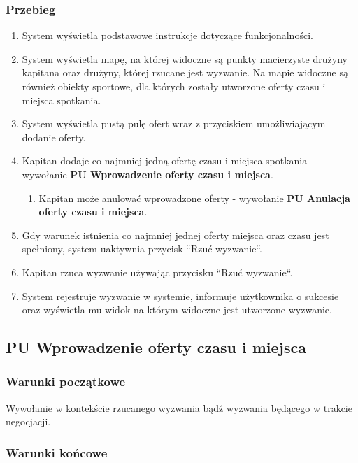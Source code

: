 \subsubsection{Przebieg}

\begin{enumerate}
  \item System wyświetla podstawowe instrukcje dotyczące funkcjonalności.
  \item System wyświetla mapę, na której widoczne są punkty macierzyste drużyny kapitana oraz drużyny, której rzucane jest wyzwanie. Na mapie widoczne są również obiekty sportowe, dla których zostały utworzone oferty czasu i miejsca spotkania.
  \item System wyświetla pustą pulę ofert wraz z przyciskiem umożliwiającym dodanie oferty.
  \item Kapitan dodaje co najmniej jedną ofertę czasu i miejsca spotkania - wywołanie \textbf{PU Wprowadzenie oferty czasu i miejsca}.
  \begin{enumerate}[label=(\alph*)]
     \item Kapitan może anulować wprowadzone oferty - wywołanie \textbf{PU Anulacja oferty czasu i miejsca}.
   \end{enumerate}
  \item Gdy warunek istnienia co najmniej jednej oferty miejsca oraz czasu jest spełniony, system uaktywnia przycisk ``Rzuć wyzwanie``.
  \item Kapitan rzuca wyzwanie używając przycisku ``Rzuć wyzwanie``.
  \item System rejestruje wyzwanie w systemie, informuje użytkownika o sukcesie oraz wyświetla mu widok na którym widoczne jest utworzone wyzwanie.
\end{enumerate}

\subsection{PU Wprowadzenie oferty czasu i miejsca}

\subsubsection{Warunki początkowe}

Wywołanie w kontekście rzucanego wyzwania bądź wyzwania będącego w trakcie negocjacji.

\subsubsection{Warunki końcowe}

